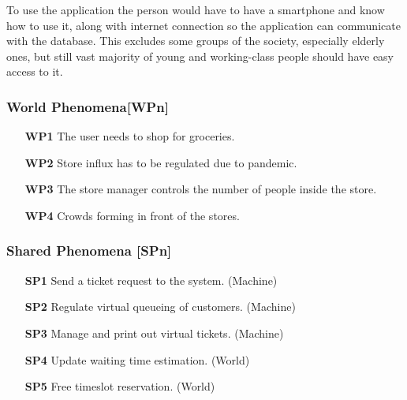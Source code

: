 To use the application the person would have to have a smartphone and know how to use it, along with internet connection so the application can communicate with the database. This excludes some groups of the society, especially elderly ones, but still vast majority of young and working-class people should have easy access to it.
\newpage

\subsubsection{World Phenomena[WPn]}
\hspace{\parindent}\begin{itemize}
	\item[\textbf{WP1}]The user needs to shop for groceries.
	\item[\textbf{WP2}]Store influx has to be regulated due to pandemic.
	\item[\textbf{WP3}]The store manager controls the number of people inside the store.
	\item[\textbf{WP4}]Crowds forming in front of the stores.
\end{itemize}


\subsubsection{Shared Phenomena [SPn]}
\hspace{\parindent}\begin{itemize}
	\item[\textbf{SP1}]Send a ticket request to the system. (Machine)
	\item[\textbf{SP2}]Regulate virtual queueing of customers. (Machine)
	\item[\textbf{SP3}]Manage and print out virtual tickets. (Machine)
	\item[\textbf{SP4}]Update waiting time estimation. (World)
	\item[\textbf{SP5}]Free timeslot reservation. (World)
\end{itemize}

\newpage

